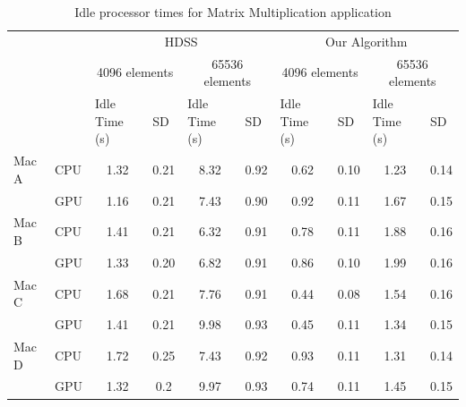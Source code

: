 \documentclass[journal]{IEEEtran}
\begin{document}
\begin{table}[htb]
\centering
\caption{Idle processor times for Matrix Multiplication application}
\begin{scriptsize}
\begin{tabular}{|l|l|l|l|l|l|l|l|l|l|}
\cline{3-10}
\multicolumn{1}{l}{} &  & \multicolumn{4}{c|}{HDSS} & \multicolumn{4}{c|}{Our Algorithm} \\ 
\cline{3-10}
\multicolumn{1}{l}{} &  & \multicolumn{2}{c|}{4096 elements} & \multicolumn{2}{c|}{65536 elements} & \multicolumn{2}{c|}{4096 elements} & \multicolumn{2}{c|}{65536 elements} \\ 
\cline{3-10}
\multicolumn{1}{l}{} &  & Idle Time (s) & SD & Idle Time (s) & SD & Idle Time (s) & SD & Idle Time (s) & SD \\ 
\hline
Mac A & CPU & \multicolumn{1}{c|}{1.32} & \multicolumn{1}{c|}{0.21} & \multicolumn{1}{c|}{8.32} & \multicolumn{1}{c|}{0.92} & \multicolumn{1}{c|}{0.62} & \multicolumn{1}{c|}{0.10} & \multicolumn{1}{c|}{1.23} & \multicolumn{1}{c|}{0.14} \\ 
\cline{2-10}
 & GPU & \multicolumn{1}{c|}{1.16} & \multicolumn{1}{c|}{0.21} & \multicolumn{1}{c|}{7.43} & \multicolumn{1}{c|}{0.90} & \multicolumn{1}{c|}{0.92} & \multicolumn{1}{c|}{0.11} & \multicolumn{1}{c|}{1.67} & \multicolumn{1}{c|}{0.15} \\ 
\hline
Mac B & CPU & \multicolumn{1}{c|}{1.41} & \multicolumn{1}{c|}{0.21} & \multicolumn{1}{c|}{6.32} & \multicolumn{1}{c|}{0.91} & \multicolumn{1}{c|}{0.78} & \multicolumn{1}{c|}{0.11} & \multicolumn{1}{c|}{1.88} & \multicolumn{1}{c|}{0.16} \\ 
\cline{2-10}
 & GPU & \multicolumn{1}{c|}{1.33} & \multicolumn{1}{c|}{0.20} & \multicolumn{1}{c|}{6.82} & \multicolumn{1}{c|}{0.91} & \multicolumn{1}{c|}{0.86} & \multicolumn{1}{c|}{0.10} & \multicolumn{1}{c|}{1.99} & \multicolumn{1}{c|}{0.16} \\ 
\hline
Mac C & CPU & \multicolumn{1}{c|}{1.68} & \multicolumn{1}{c|}{0.21} & \multicolumn{1}{c|}{7.76} & \multicolumn{1}{c|}{0.91} & \multicolumn{1}{c|}{0.44} & \multicolumn{1}{c|}{0.08} & \multicolumn{1}{c|}{1.54} & \multicolumn{1}{c|}{0.16} \\ 
\cline{2-10}
 & GPU & \multicolumn{1}{c|}{1.41} & \multicolumn{1}{c|}{0.21} & \multicolumn{1}{c|}{9.98} & \multicolumn{1}{c|}{0.93} & \multicolumn{1}{c|}{0.45} & \multicolumn{1}{c|}{0.11} & \multicolumn{1}{c|}{1.34} & \multicolumn{1}{c|}{0.15} \\ 
\hline
Mac D & CPU & \multicolumn{1}{c|}{1.72} & \multicolumn{1}{c|}{0.25} & \multicolumn{1}{c|}{7.43} & \multicolumn{1}{c|}{0.92} & \multicolumn{1}{c|}{0.93} & \multicolumn{1}{c|}{0.11} & \multicolumn{1}{c|}{1.31} & \multicolumn{1}{c|}{0.14} \\ 
\cline{2-10}
 & GPU & \multicolumn{1}{c|}{1.32} & \multicolumn{1}{c|}{0.2} & \multicolumn{1}{c|}{9.97} & \multicolumn{1}{c|}{0.93} & \multicolumn{1}{c|}{0.74} & \multicolumn{1}{c|}{0.11} & \multicolumn{1}{c|}{1.45} & \multicolumn{1}{c|}{0.15} \\ 
\hline
\end{tabular}
\end{scriptsize}
\label{table: ociosoBlocos}
\end{table}
\end{document}
